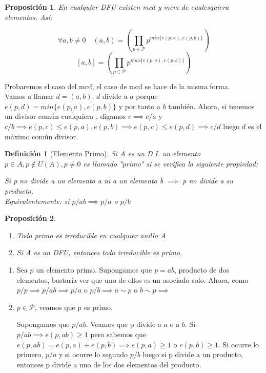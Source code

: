 \documentclass[11pt, a4paper, titlepage]{article}
\makeatletter
\renewenvironment{proof}[1][\proofname] {\vspace{-15pt}\par\pushQED{\qed}\normalfont\topsep6\p@\@plus6\p@\relax\trivlist\item[\hskip\labelsep\it#1\@addpunct{.}]\ignorespaces}{\popQED\endtrivlist\@endpefalse}
\theoremstyle{theorem-style}
\newtheorem*{nprop}{Proposición}
\theoremstyle{definition-style}
\newtheorem*{ndef}{Definición}
\theoremstyle{remark-style}
\theoremstyle{example-style}
\newenvironment{nlist}
{\begin{enumerate}
\renewcommand\labelenumi{(\emph{\roman{enumi})}}}
{\end{enumerate}}
\makeatother
\begin{document}
\begin{nprop}
En cualquier DFU existen mcd y mcm de cualesquiera elementos. Así:

\[
\forall a,b \ne 0 \quad (a,b) = (\prod _{p \in \mathcal{P}}p^{min\{e(p,a),e(p,b)\}})
\]
\[
[a,b] = (\prod _{p \in \mathcal{P}}p^{max\{e(p,a),e(p,b)\}})
\]
	
\end{nprop}
\begin{proof}
	Probaremos el caso del mcd, el caso de mcd se hace de la misma forma.\\
	Vamos a llamar $d=(a,b)$. $d$ divide a $a$ porque $e(p,d) = min \{e(p,a), e(p,b)\}$ y por tanto a $b$ también. Ahora, si tenemos un divisor común cualquiera , digamos $c \implies c/a$  y $c/b \implies e(p,c) \leq e(p,a),e(p,b) \implies e(p,c) \leq e(p,d) \implies c/d$ luego $d$ es el máximo común divisor.
\end{proof}

\begin{ndef}[Elemento Primo]
	Si $A$ es un D.I. un elemento $p\in A , p \notin U(A), p \ne 0$ es llamado "primo" si se verifica la siguiente propiedad:
	
	Si p no divide a un elemento a ni a un elemento b $\implies $ p no divide a su producto.\\
	Equivalentemente: si $p/ab \implies p/a$ o $p/b$  
	
\end{ndef}

\begin{nprop}
\begin{nlist}
	\item Todo primo es irreducible en cualquier anillo A
	\item Si A es un DFU, entonces todo irreducible es primo.
\end{nlist}
\end{nprop}
\begin{proof}
	\begin{nlist}
	\item Sea $p$ un elemento primo. Supongamos que $p=ab$, producto de dos elementos, bastaría ver que uno de ellos es un asociado solo. Ahora, como $p/p \implies p/ab \implies  p/a $ o $p/b \implies a \sim p$ o $b \sim p \implies $
	
	\item $p \in \mathcal{P}$, veamos que p es primo.
	
Supongamos que $p/ab$. Veamos que p divide a $a$ o a $b$. 
Si $p/ab\implies e(p,ab) \geq 1$ pero sabemos que $e(p,ab) = e(p,a)+e(p,b) \implies e(p,a) \geq 1$ o $e(p,b) \geq 1$. Si ocurre lo primero, $p/a$ y si ocurre lo segundo $p/b$ luego si p divide a un producto, entonces p divide a uno de los dos elementos del producto.
\end{nlist}
\end{proof}
\end{document}

